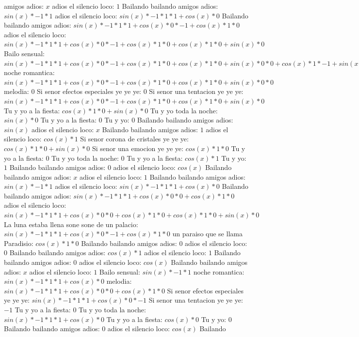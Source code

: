 \documentclass{article}
\begin{document}
amigos adios: $x$ adios el silencio loco: $1$  \newline Bailando bailando amigos adios: $sin(x)*-1*1$ adios el silencio loco: $sin(x)*-1*1*1+cos(x)*0$ Bailando bailando amigos adios: ${sin(x)*-1*1*1+cos(x)*0}*-1+cos(x)*1*0$ adios el silencio loco: ${sin(x)*-1*1*1+cos(x)*0}*-1+cos(x)*1*0+cos(x)*1*0+sin(x)*0$ Bailo sensual: ${{sin(x)*-1*1*1+cos(x)*0}*-1+cos(x)*1*0+cos(x)*1*0+sin(x)*0}*0+{cos(x)*1*-1+sin(x)*0}*0$ noche romantica: ${{sin(x)*-1*1*1+cos(x)*0}*-1+cos(x)*1*0+cos(x)*1*0+sin(x)*0}*0$ melodia: $0$ Si senor efectos especiales ye ye ye: $0$  \newline Si senor una tentacion ye ye ye: ${sin(x)*-1*1*1+cos(x)*0}*-1+cos(x)*1*0+cos(x)*1*0+sin(x)*0$  \newline Tu y yo a la fiesta: $cos(x)*1*0+sin(x)*0$  \newline Tu y yo toda la noche: $sin(x)*0$ Tu y yo a la fiesta: $0$ Tu y yo: $0$  \newline Bailando bailando amigos adios: $sin(x)$  \newline adios el silencio loco: $x$ Bailando bailando amigos adios: $1$  \newline adios el silencio loco: $cos(x)*1$ Si senor corona de cristales ye ye ye: $cos(x)*1*0+sin(x)*0$ Si senor una emocion ye ye ye: $cos(x)*1*0$ Tu y yo a la fiesta: $0$ Tu y yo toda la noche: $0$  \newline Tu y yo a la fiesta: $cos(x)*1$ Tu y yo: $1$ Bailando bailando amigos adios: $0$  \newline adios el silencio loco: $cos(x)$  \newline Bailando bailando amigos adios: $x$ adios el silencio loco: $1$  \newline Bailando bailando amigos adios: $sin(x)*-1*1$ adios el silencio loco: $sin(x)*-1*1*1+cos(x)*0$ Bailando bailando amigos adios: ${sin(x)*-1*1*1+cos(x)*0}*0+cos(x)*1*0$ adios el silencio loco: ${sin(x)*-1*1*1+cos(x)*0}*0+cos(x)*1*0+cos(x)*1*0+sin(x)*0$ La luna estaba llena sone sone de un palacio: ${sin(x)*-1*1*1+cos(x)*0}*-1+cos(x)*1*0$  \newline un paraiso que se llama Paradisio: $cos(x)*1*0$ Bailando bailando amigos adios: $0$ adios el silencio loco: $0$  \newline Bailando bailando amigos adios: $cos(x)*1$ adios el silencio loco: $1$ Bailando bailando amigos adios: $0$  \newline adios el silencio loco: $cos(x)$  \newline Bailando bailando amigos adios: $x$ adios el silencio loco: $1$  \newline Bailo sensual: $sin(x)*-1*1$ noche romantica: $sin(x)*-1*1*1+cos(x)*0$ melodia: ${sin(x)*-1*1*1+cos(x)*0}*0+cos(x)*1*0$ Si senor efectos especiales ye ye ye: ${sin(x)*-1*1*1+cos(x)*0}*-1$ Si senor una tentacion ye ye ye: $-1$ Tu y yo a la fiesta: $0$  \newline Tu y yo toda la noche: $sin(x)*-1*1*1+cos(x)*0$  \newline Tu y yo a la fiesta: $cos(x)*0$ Tu y yo: $0$ Bailando bailando amigos adios: $0$  \newline adios el silencio loco: $cos(x)$  \newline Bailando 
\end{document}
